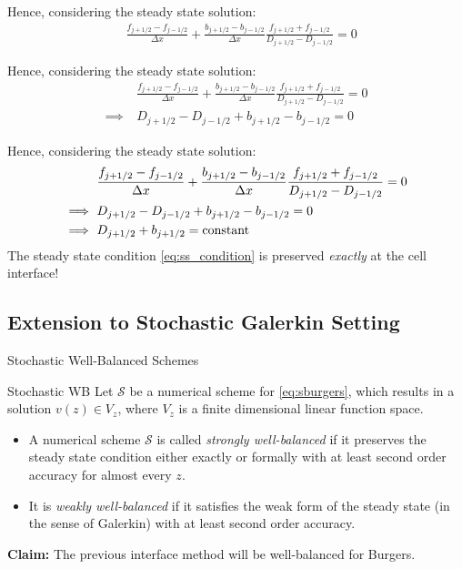 \documentclass[
    pdf,
    11pt,
    xcolor={svgnames},
  ]{beamer}
\begin{document}
\begin{frame}
    Hence, considering the steady state solution:
    \begin{align*}
        & 
        \frac{f_{j+1/2} - f_{j-1/2}}{\Delta x} + \frac{b_{j+1/2} - b_{j-1/2}}{\Delta x} \frac{f_{j+1/2} + f_{j-1/2}}{D_{j+1/2}-D_{j-1/2}} = 0
    \end{align*}
\end{frame}
\begin{frame}
    Hence, considering the steady state solution:
    \begin{align*}
        & 
        \frac{f_{j+1/2} - f_{j-1/2}}{\Delta x} + \frac{b_{j+1/2} - b_{j-1/2}}{\Delta x} \frac{f_{j+1/2} + f_{j-1/2}}{D_{j+1/2}-D_{j-1/2}} = 0 \\
        \implies\ 
        &
        D_{j+1/2} - D_{j-1/2} + b_{j+1/2} - b_{j-1/2} = 0
    \end{align*}
\end{frame}
\begin{frame}
    Hence, considering the steady state solution:
    \begin{align*}
        & 
        \frac{f_{j+1/2} - f_{j-1/2}}{\Delta x} + \frac{b_{j+1/2} - b_{j-1/2}}{\Delta x} \frac{f_{j+1/2} + f_{j-1/2}}{D_{j+1/2}-D_{j-1/2}} = 0 \\
        \implies\ 
        &
        D_{j+1/2} - D_{j-1/2} + b_{j+1/2} - b_{j-1/2} = 0 \\
        \implies\ 
        &
        D_{j+1/2} + b_{j+1/2} = {\rm constant}
    \end{align*}
    The steady state condition \eqref{eq:ss_condition} is preserved {\em exactly} at the cell interface!
\end{frame}

\subsection{Extension to Stochastic Galerkin Setting}

\begin{frame}{Stochastic Well-Balanced Schemes}
    \begin{block}{Stochastic WB}
        Let $\mathcal{S}$ be a numerical scheme for \eqref{eq:sburgers}, which results in a solution $v(z) \in V_z$, where $V_z$ is a finite dimensional linear function space.
        \begin{itemize}
            \item  A numerical scheme $\mathcal{S}$ is called {\em strongly well-balanced} if it preserves the steady state condition either exactly or formally with at least second order accuracy for almost every $z$.
            \item It is {\em weakly well-balanced} if it satisfies the weak form of the steady state (in the sense of Galerkin) with at least second order accuracy.
        \end{itemize}
    \end{block}
    \pause
    \textbf{Claim:} The previous interface method will be well-balanced for Burgers.
\end{frame}
\end{document}
